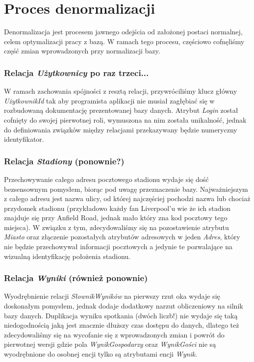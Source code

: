 \documentclass{mwrep}
\begin{document}
\section{Proces denormalizacji}
Denormalizacja jest procesem jawnego odejścia od założonej postaci normalnej, celem optymalizacji pracy z bazą.
W ramach tego procesu, częściowo cofnęliśmy część zmian wprowadzonych przy normalizacji bazy.

\subsubsection{Relacja \emph{Użytkownicy} po raz trzeci...}
W ramach zachowania spójności z resztą relacji, przywróciliśmy klucz główny \emph{UżytkownikId} tak aby programista aplikacji 
nie musiał zagłębiać się w rozbudowaną dokumentację prezentowanej bazy danych. Atrybut \emph{Login} został cofnięty do swojej pierwotnej roli,
wymuszona na nim została unikalność, jednak do definiowania związków między relacjami przekazywany będzie numeryczny identyfikator.

\subsubsection{Relacja \emph{Stadiony} (ponownie?)}
Przechowywanie całego adresu pocztowego stadionu wydaje się dość bezsensownym pomysłem, biorąc pod uwagę przeznaczenie bazy. 
Najważniejszym z całego adresu jest nazwa ulicy, od której najczęściej pochodzi nazwa lub chociaż przydomek stadionu (przykładowo każdy fan 
Liverpool'u wie że ich stadion znajduje się przy Anfield Road, jednak mało który zna kod pocztowy tego miejsca). W związku z tym, zdecydowaliśmy
się na pozostawienie atrybutu \emph{Miasto} oraz złączenie pozostałych atrybutów adresowych w jeden \emph{Adres}, który nie będzie przechowywał
informacji pocztowych a jedynie te pozwalające na wizualną identyfikację położenia stadionu.

\subsubsection{Relacja \emph{Wyniki} (również ponownie)}
Wyodrębnienie relacji \emph{SłownikWyników} na pierwszy rzut oka wydaje się doskonałym pomysłem, jednak dodaje dodatkowy narzut obliczeniowy
na silnik bazy danych. Duplikacja wyniku spotkania (dwóch liczb!) nie wydaje się taką niedogodnością jaką jest znacznie dłuższy czas dostępu do danych, dlatego też 
zdecydowaliśmy się na wycofanie się z wprowadzonych zmian i powrót do pierwotnej wersji gdzie pola \emph{WynikGospodarzy} oraz \emph{WynikGości}
nie są wyodrębnione do osobnej encji tylko są atrybutami encji \emph{Wynik}.
\end{document}
